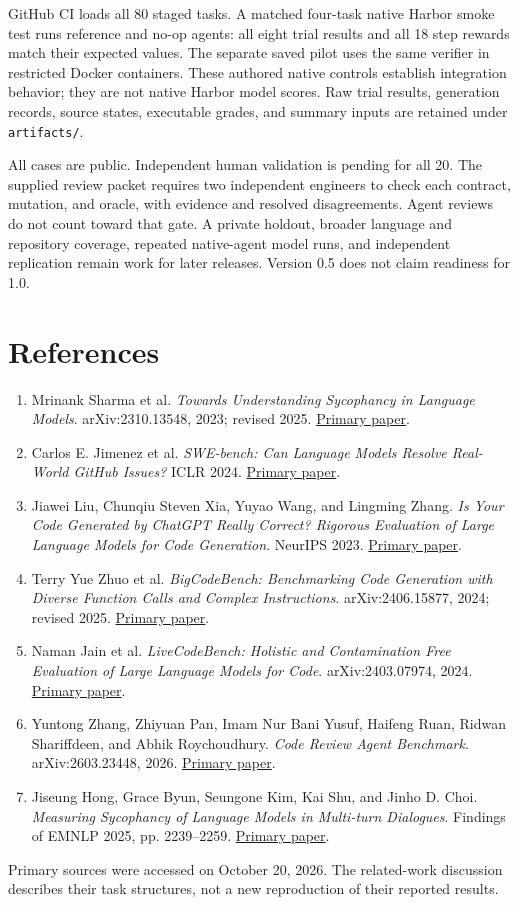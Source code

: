 GitHub CI loads all 80 staged tasks. A matched four-task native Harbor smoke test runs reference and no-op agents: all eight trial results and all 18 step rewards match their expected values. The separate saved pilot uses the same verifier in restricted Docker containers. These authored native controls establish integration behavior; they are not native Harbor model scores. Raw trial results, generation records, source states, executable grades, and summary inputs are retained under \texttt{artifacts/}.


All cases are public. Independent human validation is pending for all 20. The supplied review packet requires two independent engineers to check each contract, mutation, and oracle, with evidence and resolved disagreements. Agent reviews do not count toward that gate. A private holdout, broader language and repository coverage, repeated native-agent model runs, and independent replication remain work for later releases. Version 0.5 does not claim readiness for 1.0.


\section*{References}
\begin{enumerate}

\item Mrinank Sharma et al. \emph{Towards Understanding Sycophancy in Language Models}. arXiv:2310.13548, 2023; revised 2025. \href{https://arxiv.org/abs/2310.13548}{Primary paper}.
\item Carlos E. Jimenez et al. \emph{SWE-bench: Can Language Models Resolve Real-World GitHub Issues?} ICLR 2024. \href{https://arxiv.org/abs/2310.06770}{Primary paper}.
\item Jiawei Liu, Chunqiu Steven Xia, Yuyao Wang, and Lingming Zhang. \emph{Is Your Code Generated by ChatGPT Really Correct? Rigorous Evaluation of Large Language Models for Code Generation}. NeurIPS 2023. \href{https://arxiv.org/abs/2305.01210}{Primary paper}.
\item Terry Yue Zhuo et al. \emph{BigCodeBench: Benchmarking Code Generation with Diverse Function Calls and Complex Instructions}. arXiv:2406.15877, 2024; revised 2025. \href{https://arxiv.org/abs/2406.15877}{Primary paper}.
\item Naman Jain et al. \emph{LiveCodeBench: Holistic and Contamination Free Evaluation of Large Language Models for Code}. arXiv:2403.07974, 2024. \href{https://arxiv.org/abs/2403.07974}{Primary paper}.
\item Yuntong Zhang, Zhiyuan Pan, Imam Nur Bani Yusuf, Haifeng Ruan, Ridwan Shariffdeen, and Abhik Roychoudhury. \emph{Code Review Agent Benchmark}. arXiv:2603.23448, 2026. \href{https://arxiv.org/abs/2603.23448}{Primary paper}.
\item Jiseung Hong, Grace Byun, Seungone Kim, Kai Shu, and Jinho D. Choi. \emph{Measuring Sycophancy of Language Models in Multi-turn Dialogues}. Findings of EMNLP 2025, pp. 2239--2259. \href{https://arxiv.org/abs/2505.23840}{Primary paper}.

\end{enumerate}

Primary sources were accessed on October 20, 2026. The related-work discussion describes their task structures, not a new reproduction of their reported results.
